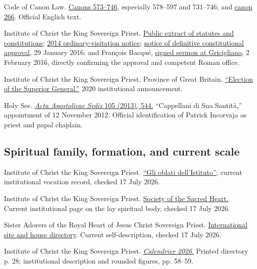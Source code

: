 Code of Canon Law. \href{https://www.vatican.va/archive/cod-iuris-canonici/eng/documents/cic_lib2-cann573-746_en.html}{Canons 573--746}, especially 578--597 and 731--746; and \href{https://www.vatican.va/archive/cod-iuris-canonici/eng/documents/cic_lib2-cann232-293_en.html}{canon 266}. Official English text.

Institute of Christ the King Sovereign Priest. \href{https://www.icrsp.org/00Presentation/Presentation.htm}{Public extract of statutes and constitutions}; \href{https://www.icrsp.org/Pages/nouvelles.html}{2014 ordinary-visitation notice}; \href{https://www.icrsp.org/Pages/constitutions.html}{notice of definitive constitutional approval}, 29 January 2016; and François Bacqué, \href{https://www.icrsp.org/Pages/sermons.php?groupe=2016\&nom=purification}{signed sermon at Gricigliano}, 2 February 2016, directly confirming the approval and competent Roman office.

Institute of Christ the King Sovereign Priest, Province of Great Britain. \href{https://icksp.org.uk/blog/election-of-the-superior-general/}{``Election of the Superior General.''} 2020 institutional announcement.

Holy See. \href{https://www.vatican.va/archive/aas/documents/2013/actagiugno2013.pdf}{\emph{Acta Apostolicae Sedis} 105 (2013), 544.} ``Cappellani di Sua Santità,'' appointment of 12 November 2012. Official identification of Patrick Incorvaja as priest and papal chaplain.

\subsection{Spiritual family, formation, and current scale}

Institute of Christ the King Sovereign Priest. \href{https://www.icrss.it/vocazioni/i-frati-dellistituto/}{``Gli oblati dell'Istituto''}; current institutional vocation record, checked 17 July 2026.

Institute of Christ the King Sovereign Priest. \href{https://www.institute-christ-king.org/institute/lay-society}{Society of the Sacred Heart.} Current institutional page on the lay spiritual body, checked 17 July 2026.

Sister Adorers of the Royal Heart of Jesus Christ Sovereign Priest. \href{https://adoratrices.icrss.org/en/}{International site and house directory}. Current self-description, checked 17 July 2026.

Institute of Christ the King Sovereign Priest. \href{https://www.icrsp.org/Calendriers/Calendrier-2026/Calendrier_FR_2026_web.pdf}{\emph{Calendrier 2026}.} Printed directory p. 28; institutional description and rounded figures, pp. 58--59.

